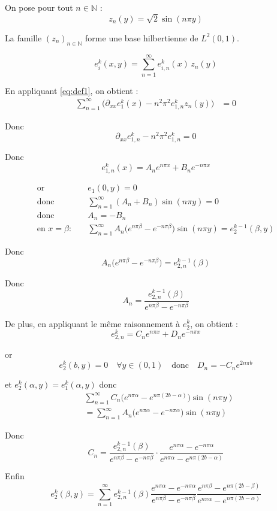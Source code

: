 \documentclass{article}
\begin{document}
On pose pour tout $n \in \mathbb{N}$ :
\[
z_n(y) = \sqrt{2}\sin(n\pi y)
\]

La famille $(z_n)_{n\in\mathbb{N}}$ forme une base hilbertienne de $L^2(0,1)$.


\[
e_i^k(x,y) = \sum_{n=1}^{\infty} e_{i,n}^k(x)\, z_n(y)
\]



En appliquant \eqref{eq:def1}, on obtient :
\begin{align*}
\sum_{n=1}^{\infty}\Big(\partial_{xx}e_1^k(x) - n^2\pi^2 e_{1,n}^k z_n(y)\Big) &= 0
\end{align*}

Donc
\[
\partial_{xx} e_{1,n}^k - n^2\pi^2 e_{1,n}^k = 0
\]

Donc
\[
e_{1,n}^k(x) = A_n e^{n\pi x} + B_n e^{-n\pi x}
\]

\begin{align*}
\text{or } \quad & e_1(0, y) = 0 \\[6pt]
\text{donc} \quad & \sum_{n=1}^{\infty}(A_n + B_n)\sin(n\pi y) = 0 \\[6pt]
\text{donc} \quad & A_n = -B_n \\[6pt]
\text{en } x=\beta : \quad &
\sum_{n=1}^{\infty} A_n\big(e^{n\pi\beta} - e^{-n\pi\beta}\big)\sin(n\pi y)
= e_2^{k-1}(\beta,y)
\end{align*}

Donc
\[
A_n\big(e^{n\pi\beta} - e^{-n\pi\beta}\big)
= e_{2,n}^{k-1}(\beta)
\]

Donc
\[
A_n =
\frac{e_{2,n}^{k-1}(\beta)}
{e^{n\pi\beta} - e^{-n\pi\beta}}
\]

\vspace{6pt}

De plus, en appliquant le même raisonnement à $e_2^k$, on obtient :
\[
e_{2,n}^k = C_n e^{n\pi x} + D_n e^{-n\pi x}
\]

or
\[
e_2^k(b,y)=0 \quad \forall y\in(0,1)
\quad \text{donc} \quad
D_n = -C_n e^{2n\pi b}
\]

\vspace{6pt}

et $e_2^k(\alpha,y)=e_1^k(\alpha,y)$ donc
\begin{align*}
&\sum_{n=1}^{\infty} C_n\big(e^{n\pi\alpha} - e^{n\pi(2b-\alpha)}\big)\sin(n\pi y) \\
&= \sum_{n=1}^{\infty} A_n\big(e^{n\pi\alpha} - e^{-n\pi\alpha}\big)\sin(n\pi y)
\end{align*}

Donc
\[
C_n =
\frac{e_{2,n}^{k-1}(\beta)}
{e^{n\pi\beta} - e^{-n\pi\beta}}
\cdot
\frac{e^{n\pi\alpha} - e^{-n\pi\alpha}}
{e^{n\pi\alpha} - e^{n\pi(2b-\alpha)}}
\]

Enfin
\[
e_2^k(\beta,y)
=
\sum_{n=1}^{\infty}
e_{2,n}^{k-1}(\beta)
\frac{e^{n\pi\alpha} - e^{-n\pi\alpha}}
{e^{n\pi\beta} - e^{-n\pi\beta}}
\frac{e^{n\pi\beta} - e^{n\pi(2b-\beta)}}
{e^{n\pi\alpha} - e^{n\pi(2b-\alpha)}}
\]
\end{document}
